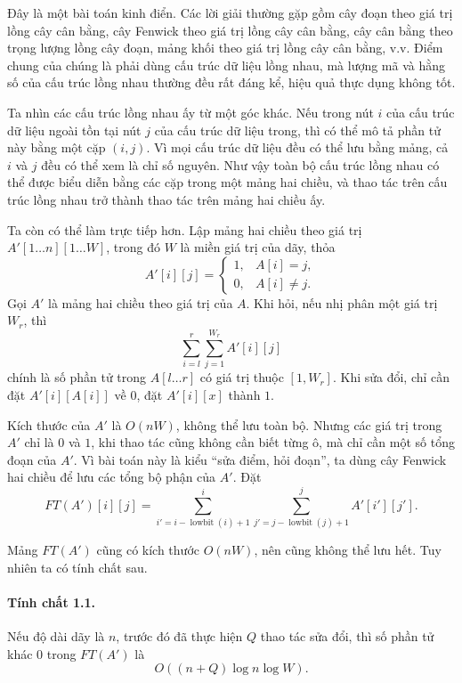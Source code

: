 \documentclass[11pt]{article}
\begin{document}
Đây là một bài toán kinh điển. Các lời giải thường gặp gồm cây đoạn theo giá
trị lồng cây cân bằng, cây Fenwick theo giá trị lồng cây cân bằng, cây cân bằng
theo trọng lượng lồng cây đoạn, mảng khối theo giá trị lồng cây cân bằng, v.v.
Điểm chung của chúng là phải dùng cấu trúc dữ liệu lồng nhau, mà lượng mã và
hằng số của cấu trúc lồng nhau thường đều rất đáng kể, hiệu quả thực dụng không
tốt.

Ta nhìn các cấu trúc lồng nhau ấy từ một góc khác. Nếu trong nút \(i\) của cấu
trúc dữ liệu ngoài tồn tại nút \(j\) của cấu trúc dữ liệu trong, thì có thể mô
tả phần tử này bằng một cặp \((i,j)\). Vì mọi cấu trúc dữ liệu đều có thể lưu
bằng mảng, cả \(i\) và \(j\) đều có thể xem là chỉ số nguyên. Như vậy toàn bộ
cấu trúc lồng nhau có thể được biểu diễn bằng các cặp trong một mảng hai
chiều, và thao tác trên cấu trúc lồng nhau trở thành thao tác trên mảng hai
chiều ấy.

Ta còn có thể làm trực tiếp hơn. Lập mảng hai chiều theo giá trị
\(A'[1\ldots n][1\ldots W]\), trong đó \(W\) là miền giá trị của dãy, thỏa
\[
  A'[i][j]=
  \begin{cases}
    1, & A[i]=j,\\
    0, & A[i]\ne j.
  \end{cases}
\]
Gọi \(A'\) là mảng hai chiều theo giá trị của \(A\). Khi hỏi, nếu nhị phân một
giá trị \(W_r\), thì
\[
  \sum_{i=l}^{r}\sum_{j=1}^{W_r} A'[i][j]
\]
chính là số phần tử trong \(A[l\ldots r]\) có giá trị thuộc \([1,W_r]\). Khi
sửa đổi, chỉ cần đặt \(A'[i][A[i]]\) về \(0\), đặt \(A'[i][x]\) thành \(1\).

Kích thước của \(A'\) là \(O(nW)\), không thể lưu toàn bộ. Nhưng các giá trị
trong \(A'\) chỉ là \(0\) và \(1\), khi thao tác cũng không cần biết từng ô,
mà chỉ cần một số tổng đoạn của \(A'\). Vì bài toán này là kiểu ``sửa điểm,
hỏi đoạn'', ta dùng cây Fenwick hai chiều để lưu các tổng bộ phận của \(A'\).
Đặt
\[
  FT(A')[i][j]=
  \sum_{i'=i-\operatorname{lowbit}(i)+1}^{i}
  \sum_{j'=j-\operatorname{lowbit}(j)+1}^{j} A'[i'][j'].
\]

Mảng \(FT(A')\) cũng có kích thước \(O(nW)\), nên cũng không thể lưu hết. Tuy
nhiên ta có tính chất sau.

\paragraph{Tính chất 1.1.}
Nếu độ dài dãy là \(n\), trước đó đã thực hiện \(Q\) thao tác sửa đổi, thì số
phần tử khác \(0\) trong \(FT(A')\) là
\[
  O((n+Q)\log n\log W).
\]
\end{document}
